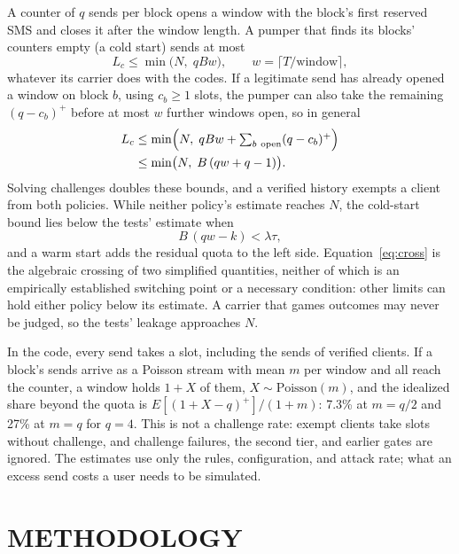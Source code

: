 \documentclass{IEEEoj}
\begin{document}
A counter of $q$ sends per block opens a window with the block's first reserved SMS and closes it after the window length. A pumper that finds its blocks' counters empty (a cold start) sends at most
\begin{equation}
L_c \le \min\bigl(N,\; q B w\bigr), \qquad w = \lceil T / \text{window} \rceil,
\label{eq:counter}
\end{equation}
whatever its carrier does with the codes. If a legitimate send has already opened a window on block $b$, using $c_b \ge 1$ slots, the pumper can also take the remaining $(q-c_b)^+$ before at most $w$ further windows open, so in general
\begin{equation}
\begin{split}
L_c &\le \min\Bigl(N,\; q B w + \textstyle\sum_{b\ \mathrm{open}} (q - c_b)^+\Bigr) \\
    &\le \min\bigl(N,\; B\,(q w + q - 1)\bigr).
\end{split}
\label{eq:counterwarm}
\end{equation}
Solving challenges doubles these bounds, and a verified history exempts a client from both policies. While neither policy's estimate reaches $N$, the cold-start bound lies below the tests' estimate when
\begin{equation}
B\,(q w - k) < \lambda\tau,
\label{eq:cross}
\end{equation}
and a warm start adds the residual quota to the left side. Equation~\eqref{eq:cross} is the algebraic crossing of two simplified quantities, neither of which is an empirically established switching point or a necessary condition: other limits can hold either policy below its estimate. A carrier that games outcomes may never be judged, so the tests' leakage approaches $N$.

In the code, every send takes a slot, including the sends of verified clients. If a block's sends arrive as a Poisson stream with mean $m$ per window and all reach the counter, a window holds $1 + X$ of them, $X \sim \mathrm{Poisson}(m)$, and the idealized share beyond the quota is $E[(1+X-q)^+]/(1+m)$: 7.3\% at $m = q/2$ and 27\% at $m = q$ for $q = 4$. This is not a challenge rate: exempt clients take slots without challenge, and challenge failures, the second tier, and earlier gates are ignored. The estimates use only the rules, configuration, and attack rate; what an excess send costs a user needs to be simulated.

\section{METHODOLOGY}
\label{sec:method}
\end{document}
